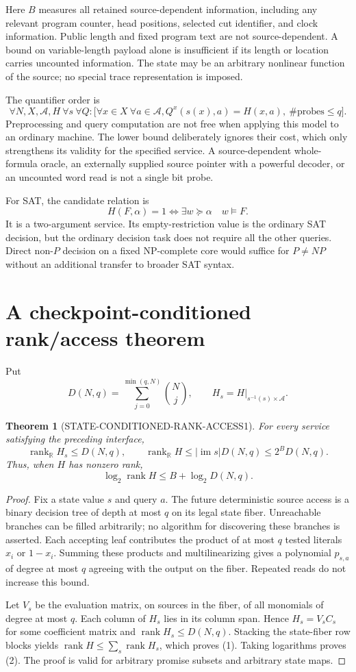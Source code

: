 \documentclass[11pt]{article}
\newtheorem{theorem}{Theorem}
\newcommand{\rank}{\operatorname{rank}}
\begin{document}
Here $B$ measures all retained source-dependent information, including any
relevant program counter, head positions, selected cut identifier, and clock
information. Public length and fixed program text are not source-dependent.
A bound on variable-length payload alone is insufficient if its length or
location carries uncounted information. The state may be an arbitrary
nonlinear function of the source; no special trace representation is imposed.

The quantifier order is
\[
 \forall N,X,\mathcal A,H\ \forall s\ \forall Q:
 \bigl[\forall x\in X\ \forall a\in\mathcal A,
 Q^{x}(s(x),a)=H(x,a),\ \#\mathrm{probes}\le q\bigr].
\]
Preprocessing and query computation are not free when applying this model to
an ordinary machine. The lower bound deliberately ignores their cost, which
only strengthens its validity for the specified service. A source-dependent
whole-formula oracle, an externally supplied source pointer with a powerful
decoder, or an uncounted word read is not a single bit probe.

For SAT, the candidate relation is
\[
 H(F,\alpha)=1\iff\exists w\succeq\alpha\quad w\models F.
\]
It is a two-argument service. Its empty-restriction value is the ordinary
SAT decision, but the ordinary decision task does not require all the other
queries. Direct non-$P$ decision on a fixed NP-complete core would suffice
for $P\ne NP$ without an additional transfer to broader SAT syntax.

\section{A checkpoint-conditioned rank/access theorem}
Put
\[
 D(N,q)=\sum_{j=0}^{\min(q,N)}\binom Nj,
 \qquad H_s=H\big|_{s^{-1}(s)\times\mathcal A}.
\]
\begin{theorem}[STATE-CONDITIONED-RANK-ACCESS1]
For every service satisfying the preceding interface,
\[
 \rank_{\mathbb R}H_s\le D(N,q),\qquad
 \boxed{\rank_{\mathbb R}H\le |\operatorname{im}s|D(N,q)
                         \le2^B D(N,q).}
 \tag{1}
\]
Thus, when $H$ has nonzero rank,
\[
 \log_2\rank H\le B+\log_2 D(N,q).
 \tag{2}
\]
\end{theorem}
\begin{proof}
Fix a state value $s$ and query $a$. The future deterministic source access
is a binary decision tree of depth at most $q$ on its legal state fiber.
Unreachable branches can be filled arbitrarily; no algorithm for discovering
these branches is asserted. Each accepting leaf contributes the product of
at most $q$ tested literals $x_i$ or $1-x_i$. Summing these products and
multilinearizing gives a polynomial $p_{s,a}$ of degree at most $q$ agreeing
with the output on the fiber. Repeated reads do not increase this bound.

Let $V_s$ be the evaluation matrix, on sources in the fiber, of all monomials
of degree at most $q$. Each column of $H_s$ lies in its column span. Hence
$H_s=V_s C_s$ for some coefficient matrix and $\rank H_s\le D(N,q)$.
Stacking the state-fiber row blocks yields
$\rank H\le\sum_s\rank H_s$, which proves (1). Taking logarithms proves (2).
The proof is valid for arbitrary promise subsets and arbitrary state maps.
\end{proof}
\end{document}
